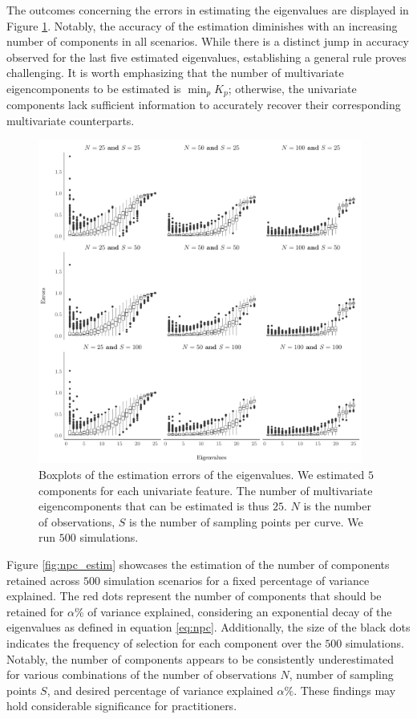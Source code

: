The outcomes concerning the errors in estimating the eigenvalues are displayed in Figure \ref{fig:ncomp}. Notably, the accuracy of the estimation diminishes with an increasing number of components in all scenarios. While there is a distinct jump in accuracy observed for the last five estimated eigenvalues, establishing a general rule proves challenging. It is worth emphasizing that the number of multivariate eigencomponents to be estimated is $\min_p K_p$; otherwise, the univariate components lack sufficient information to accurately recover their corresponding multivariate counterparts.
\begin{figure}
     \centering
    \includegraphics[width=0.95\textwidth]{figures/ncomp.pdf}
    \caption{Boxplots of the estimation errors of the eigenvalues. We estimated $5$ components for each univariate feature. The number of multivariate eigencomponents that can be estimated is thus $25$. $N$ is the number of observations, $S$ is the number of sampling points per curve. We run $500$ simulations.}
    \label{fig:ncomp}
\end{figure}
Figure \ref{fig:npc_estim} showcases the estimation of the number of components retained across $500$ simulation scenarios for a fixed percentage of variance explained. The red dots represent the number of components that should be retained for $\alpha\%$ of variance explained, considering an exponential decay of the eigenvalues as defined in equation \eqref{eq:npc}. Additionally, the size of the black dots indicates the frequency of selection for each component over the $500$ simulations. Notably, the number of components appears to be consistently underestimated for various combinations of the number of observations $N$, number of sampling points $S$, and desired percentage of variance explained $\alpha\%$. These findings may hold considerable significance for practitioners.
